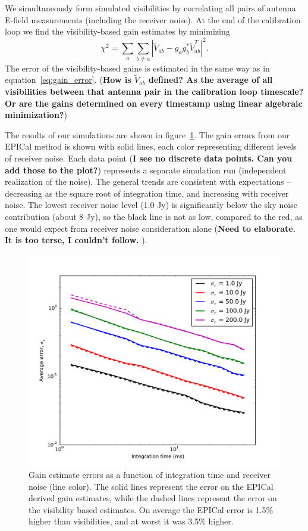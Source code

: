 \documentclass[a4paper,fleqn,usenatbib]{../mnras}
\newcommand{\V}{\ensuremath{\widetilde{V}}}
\begin{document}
We simultaneously form simulated visibilities by correlating all pairs of antenna E-field measurements (including the receiver noise). At the end of the calibration loop we find the visibility-based gain estimates by minimizing
\begin{equation}\label{eq:vis_cal}
\chi^2 = \sum_a\sum_{b\ne a} \left|\V_{ab}-g_a g_b^* \V^T_{ab}\right|^2.
\end{equation}
The error of the visibility-based gains is estimated in the same way as in equation~\ref{eq:gain_error}. ({\bf How is $\widetilde{V}_{ab}$ defined? As the average of all visibilities between that antenna pair in the calibration loop timescale? Or are the gains determined on every timestamp using linear algebraic minimization?})

The results of our simulations are shown in figure~\ref{fig:noise}. The gain errors from our EPICal method is shown with solid lines, each color representing different levels of receiver noise. Each data point ({\bf I see no discrete data points. Can you add those to the plot?}) represents a separate simulation run (independent realization of the noise). The general trends are consistent with expectations -- decreasing as the square root of integration time, and increasing with receiver noise. The lowest receiver noise level (1.0 Jy) is significantly below the sky noise contribution (about 8 Jy), so the black line is not as low, compared to the red, as one would expect from receiver noise consideration alone ({\bf Need to elaborate. It is too terse, I couldn't follow. }).

\begin{figure}
\begin{center}
\includegraphics[width=\columnwidth]{figures/cal_paper_noise_med_sky.pdf}
\caption{Gain estimate errors as a function of integration time and receiver noise (line color). The solid lines represent the error on the EPICal derived gain estimates, while the dashed lines represent the error on the visibility based estimates. On average the EPICal error is 1.5\% higher than visibilities, and at worst it was 3.5\% higher.
}
\label{fig:noise}
\end{center}
\end{figure}
\end{document}
